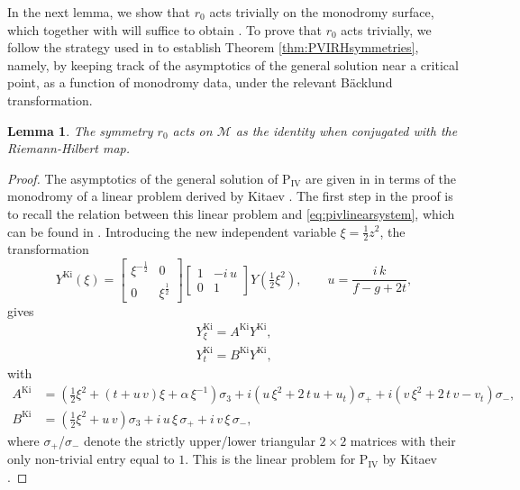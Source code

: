 \documentclass[a4paper,reqno]{amsart}
\numberwithin{equation}{section}
\newcommand\Pfour{\textrm{P}_{\textrm{IV}}}
\newtheorem{lemma}[theorem]{Lemma}
\numberwithin{equation}{section}
\begin{document}
In the next lemma, we show that $r_0$ acts trivially on the monodromy surface, which together with  will suffice to obtain . To prove that $r_0$ acts trivially, we follow the strategy used in \cite{inabaiwasakisaito} to establish Theorem \ref{thm:PVIRHsymmetries}, namely, by keeping track of the asymptotics of the general solution near a critical point, as a function of monodromy data, under the relevant B\"acklund transformation.
\begin{lemma} \label{lem:PIVsymmetryunderRHasymptotic}
The symmetry $r_0$ acts on $\mathcal{M}$ as the identity when conjugated with the Riemann-Hilbert map.
\end{lemma}
\begin{proof}
  The asymptotics of the general solution of $\Pfour$ are given in \cite{kapaev1996} in terms of the monodromy of a linear problem derived by Kitaev \cite{kitaev85}. The first step in the proof is to recall the relation between this linear problem and \eqref{eq:pivlinearsystem}, which can be found in \cite{kapaevhubert}. Introducing the new independent variable $\xi=\frac{1}{2}z^2$, the transformation
  \begin{equation*}
    Y^{\text{Ki}}(\xi)=\begin{bmatrix}
        \xi^{-\frac{1}{2}} & 0\\
        0 & \xi^{\frac{1}{2}}
    \end{bmatrix}\begin{bmatrix}
        1 & -i\, u\\
        0 & 1
    \end{bmatrix}Y(\tfrac{1}{2}\xi^2),\qquad u=\frac{i\,k}{f-g+2 t},
  \end{equation*}
  gives
  \begin{align*}
      Y_\xi^{\text{Ki}}=A^{\text{Ki}}Y^{\text{Ki}},\\
      Y_t^{\text{Ki}}=B^{\text{Ki}}Y^{\text{Ki}},   
  \end{align*}
with
\begin{align*}
    A^{\text{Ki}}&=(\tfrac{1}{2}\xi^2+(t+u\,v)\xi+\alpha\,\xi^{-1})\sigma_3+i(u\,\xi^2+2\,t\,u+u_t)\sigma_++i(v\,\xi^2+2\,t\,v-v_t)\sigma_-,\\
     B^{\text{Ki}}&=(\tfrac{1}{2}\xi^2+u\,v)\sigma_3+i\,u\,\xi\,\sigma_++i\,v\,\xi\,\sigma_-,
\end{align*}
where $\sigma_+$/$\sigma_-$ denote the strictly upper/lower triangular $2\times 2$ matrices with their only non-trivial entry equal to $1$. This is the linear problem for $\Pfour$ by Kitaev \cite{kitaev85}.


\end{proof}
\end{document}
